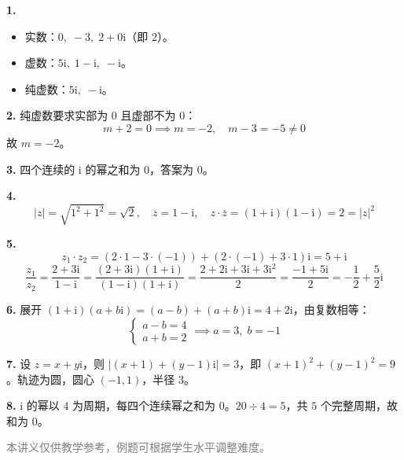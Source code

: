 \documentclass[12pt, a4paper]{ctexart}
\begin{document}
\vspace{12pt}

\begin{knowledgebox}[参考答案]

\textbf{1.}
\begin{itemize}[leftmargin=2em]
  \item 实数：$0,\; -3,\; 2+0\mathrm{i}$（即 $2$）。
  \item 虚数：$5\mathrm{i},\; 1-\mathrm{i},\; -\mathrm{i}$。
  \item 纯虚数：$5\mathrm{i},\; -\mathrm{i}$。
\end{itemize}

\textbf{2.} 纯虚数要求实部为 $0$ 且虚部不为 $0$：
\[
  m + 2 = 0 \implies m = -2,\quad m - 3 = -5 \neq 0
\]
故 $m = -2$。

\textbf{3.} 四个连续的 $\mathrm{i}$ 的幂之和为 $0$，答案为 $0$。

\textbf{4.}
\[
  |z| = \sqrt{1^2 + 1^2} = \sqrt{2},\quad
  \overline{z} = 1 - \mathrm{i},\quad
  z \cdot \overline{z} = (1+\mathrm{i})(1-\mathrm{i}) = 2 = |z|^2
\]

\textbf{5.}
\[
  z_1 \cdot z_2 = (2 \cdot 1 - 3 \cdot (-1)) + (2 \cdot (-1) + 3 \cdot 1)\mathrm{i} = 5 + \mathrm{i}
\]
\[
  \frac{z_1}{z_2} = \frac{2+3\mathrm{i}}{1-\mathrm{i}} = \frac{(2+3\mathrm{i})(1+\mathrm{i})}{(1-\mathrm{i})(1+\mathrm{i})}
  = \frac{2+2\mathrm{i}+3\mathrm{i}+3\mathrm{i}^2}{2} = \frac{-1+5\mathrm{i}}{2} = -\frac{1}{2} + \frac{5}{2}\mathrm{i}
\]

\textbf{6.} 展开 $(1+\mathrm{i})(a+b\mathrm{i}) = (a-b) + (a+b)\mathrm{i} = 4 + 2\mathrm{i}$，由复数相等：
\[
  \begin{cases} a - b = 4 \\ a + b = 2 \end{cases}
  \implies a = 3,\; b = -1
\]

\textbf{7.} 设 $z=x+y\mathrm{i}$，则 $|(x+1)+(y-1)\mathrm{i}|=3$，即 $(x+1)^2+(y-1)^2=9$。轨迹为圆，圆心 $(-1,1)$，半径 $3$。

\textbf{8.} $\mathrm{i}$ 的幂以 $4$ 为周期，每四个连续幂之和为 $0$。$20 \div 4 = 5$，共 $5$ 个完整周期，故和为 $0$。

\end{knowledgebox}

\vfill
\begin{center}
\small\textcolor{gray}{本讲义仅供教学参考，例题可根据学生水平调整难度。}
\end{center}
\end{document}
